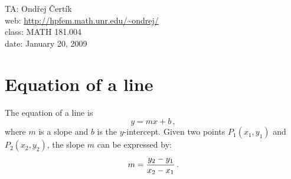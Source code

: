 \documentclass[10pt]{article}
\begin{document}
\noindent TA: Ondřej Čertík\\
web: \url{http://hpfem.math.unr.edu/~ondrej/}\\
class: MATH 181.004\\
date: January 20, 2009

\section{Equation of a line}

The equation of a line is
$$y=mx+b\,,$$
where $m$ is a slope and $b$ is the $y$-intercept. Given two points $P_1(x_1,
y_1)$ and $P_2(x_2, y_2)$, the slope $m$ can be expressed by:
$$m={y_2-y_1\over x_2-x_1}\,.$$
\end{document}
